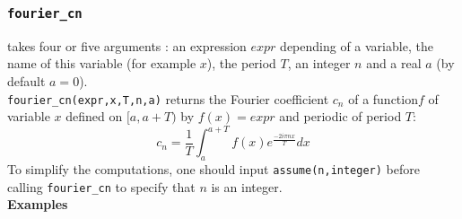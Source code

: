 \documentclass[a4paper,11pt]{book}
\begin{document}
\subsubsection{\tt fourier\_cn}\label{sec:fourier_cn}
 takes four or five arguments : an expression $expr$
depending of a variable, the name of this variable (for example $x$), the 
period $T$, an integer $n$ and a real $a$ (by default $a=0$).\\
{\tt fourier\_cn(expr,x,T,n,a)} returns the Fourier coefficient $c_n$ of a 
function$f$ of variable $x$ defined on $[a,a+T)$ by $f(x)=expr$ and  periodic 
of period $T$:
$$\displaystyle c_n=\frac{1}{T}\int_a^{a+T}f(x)e^{\frac{-2i\pi nx}{T}}dx$$
To simplify the computations, one should
input {\tt assume(n,integer)} before calling {\tt fourier\_cn}
to specify that $n$ is an integer.\\
{\bf Examples}
\end{document}
